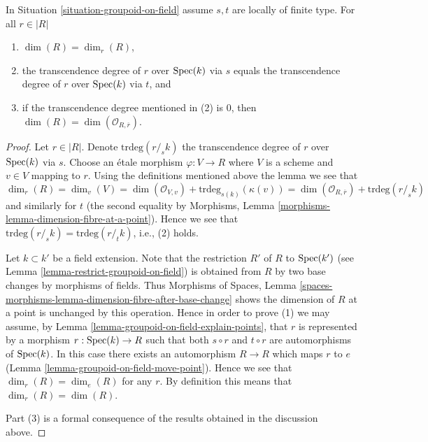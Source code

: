 \begin{lemma}
\label{lemma-groupoid-on-field-locally-finite-type-dimension}
In
Situation \ref{situation-groupoid-on-field}
assume $s, t$ are locally of finite type.
For all $r \in |R|$
\begin{enumerate}
\item $\dim(R) = \dim_r(R)$,
\item the transcendence degree of $r$ over $\mathop{\rm Spec}(k)$
via $s$ equals the transcendence degree of $r$ over $\mathop{\rm Spec}(k)$
via $t$, and
\item if the transcendence degree mentioned in (2) is $0$, then
$\dim(R) = \dim(\mathcal{O}_{R, \overline{r}})$.
\end{enumerate}
\end{lemma}

\begin{proof}
Let $r \in |R|$. Denote $\text{trdeg}(r/_{\!\!s}k)$ the transcendence
degree of $r$ over $\mathop{\rm Spec}(k)$ via $s$. Choose an \'etale morphism
$\varphi : V \to R$ where $V$ is a scheme and $v \in V$ mapping to $r$.
Using the definitions mentioned above the lemma we see that
$$
\dim_r(R) = \dim_v(V) =
\dim(\mathcal{O}_{V, v}) + \text{trdeg}_{s(k)}(\kappa(v)) =
\dim(\mathcal{O}_{R, \overline{r}}) + \text{trdeg}(r/_{\!\!s}k)
$$
and similarly for $t$ (the second equality by
Morphisms, Lemma \ref{morphisms-lemma-dimension-fibre-at-a-point}).
Hence we see that $\text{trdeg}(r/_{\!\!s}k) = \text{trdeg}(r/_{\!\!t}k)$,
i.e., (2) holds.

\medskip\noindent
Let $k \subset k'$ be a field extension. Note that the restriction $R'$
of $R$ to $\mathop{\rm Spec}(k')$ (see
Lemma \ref{lemma-restrict-groupoid-on-field})
is obtained from $R$ by two base changes by morphisms of fields. Thus
Morphisms of Spaces,
Lemma \ref{spaces-morphisms-lemma-dimension-fibre-after-base-change}
shows the dimension of $R$ at a point is unchanged by this operation.
Hence in order to prove (1) we may assume, by
Lemma \ref{lemma-groupoid-on-field-explain-points},
that $r$ is represented by a morphism $r : \mathop{\rm Spec}(k) \to R$ such
that both $s \circ r$ and $t \circ r$ are automorphisms of $\mathop{\rm Spec}(k)$.
In this case there exists an automorphism $R \to R$ which maps $r$ to $e$
(Lemma \ref{lemma-groupoid-on-field-move-point}).
Hence we see that $\dim_r(R) = \dim_e(R)$ for any $r$. By definition this
means that $\dim_r(R) = \dim(R)$.

\medskip\noindent
Part (3) is a formal consequence of the results obtained in the discussion
above.
\end{proof}

